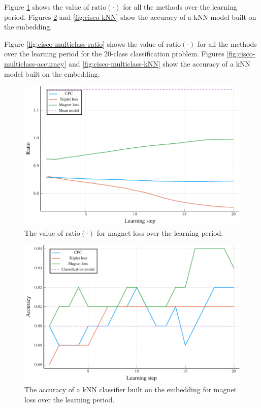 Figure \ref{fig:cisco-ratio} shows the value of \( \mathrm{ratio} \left( \cdot \right) \) for all the methods over the learning period. Figures \ref{fig:cisco-accuracy} and \ref{fig:cisco-kNN} show the accuracy of a kNN model built on the embedding.

Figure \ref{fig:cisco-multiclass-ratio} shows the value of \( \mathrm{ratio} \left( \cdot \right) \) for all the methods over the learning period for the 20-class classification problem. Figures \ref{fig:cisco-multiclass-accuracy} and \ref{fig:cisco-multiclass-kNN} show the accuracy of a kNN model built on the embedding. 

\begin{figure}[h]
  \centering
  \includegraphics[width=\textwidth]{images/cisco/ratio/cisco-ratio.pdf}
  \caption{The value of \( \mathrm{ratio} \left( \cdot \right) \) for magnet loss over the learning period.}\label{fig:cisco-ratio}
\end{figure}

\begin{figure}[h]
  \centering
  \includegraphics[width=\textwidth]{images/cisco/accuracy/cisco-accuracy.pdf}
  \caption{The accuracy of a kNN classifier built on the embedding for magnet loss over the learning period.}\label{fig:cisco-accuracy}
\end{figure}

